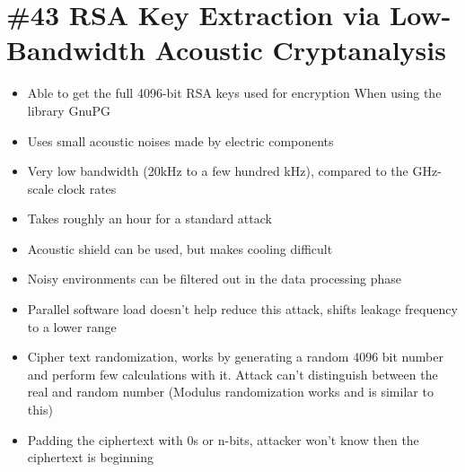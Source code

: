 \section{\#43 RSA Key Extraction via Low-Bandwidth Acoustic Cryptanalysis}
\begin{itemize}
	\item Able to get the full 4096-bit RSA keys used for encryption
	\subitem When using the library GnuPG
	\item Uses small acoustic noises made by electric components
	\item Very low bandwidth (20kHz to a few hundred kHz), compared to the GHz-scale clock rates
	\item Takes roughly an hour for a standard attack
	\item Acoustic shield can be used, but makes cooling difficult
	\item Noisy environments can be filtered out in the data processing phase
	\item Parallel software load doesn't help reduce this attack, shifts leakage frequency to a lower range
	\item Cipher text randomization, works by generating a random 4096 bit number and perform few calculations with it. Attack can't distinguish between the real and random number (Modulus randomization works and is similar to this)
	\item Padding the ciphertext with 0s or n-bits, attacker won't know then the ciphertext is beginning
\end{itemize}